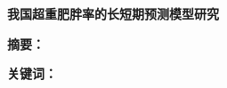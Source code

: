 \documentclass[a4paper,12pt]{article}
\begin{document}
\begin{center}
  {\LARGE\bfseries 我国超重肥胖率的长短期预测模型研究}
\end{center}
\vspace{1em}

\noindent\textbf{摘\quad 要：}
\vspace{0.5em}

\noindent\textbf{关键词：}

\newpage












\end{document}
